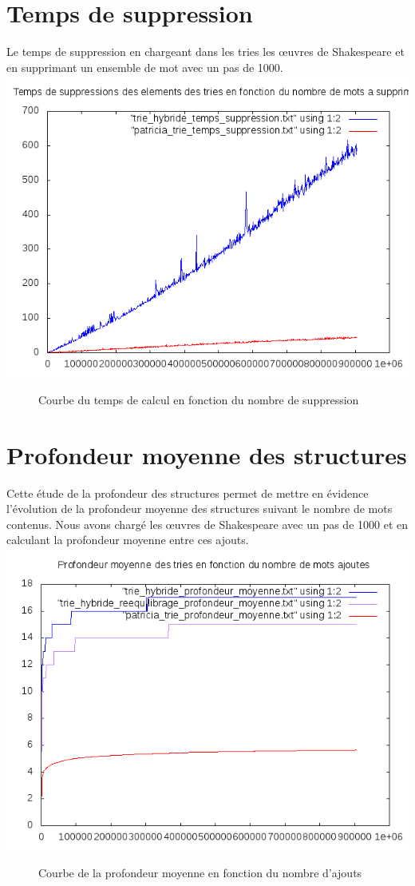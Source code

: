 \documentclass[a4paper,12pt]{report}
\begin{document}
\section{Temps de suppression}
Le temps de suppression en chargeant dans les tries les œuvres de Shakespeare et en supprimant un ensemble de mot avec un pas
de 1000.\\
\includegraphics{../comparaison/courbe_temps_suppression.png}
\begin{figure}[!htbp]
\caption{Courbe du temps de calcul en fonction du nombre de suppression}
\end{figure}

\section{Profondeur moyenne des structures}
Cette étude de la profondeur des structures permet de mettre en évidence l'évolution de la profondeur moyenne des structures
suivant le nombre de mots contenus. Nous avons chargé les œuvres de Shakespeare avec un pas de 1000 et en calculant la profondeur
moyenne entre ces ajouts.\\
\includegraphics{../comparaison/courbe_profondeur_moyenne.png}
\begin{figure}[!htbp]
\caption{Courbe de la profondeur moyenne en fonction du nombre d'ajouts}
\end{figure}
\end{document}
